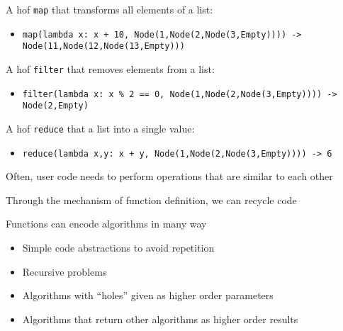 \documentclass{beamer}
\begin{document}
\begin{slide}{
\item A hof \texttt{map} that transforms all elements of a list:
\begin{itemize}
\item \texttt{map(lambda x: x + 10, Node(1,Node(2,Node(3,Empty)))) -> Node(11,Node(12,Node(13,Empty)))}
\end{itemize}
\item A hof \texttt{filter} that removes elements from a list:
\begin{itemize}
\item \texttt{filter(lambda x: x \% 2 == 0, Node(1,Node(2,Node(3,Empty)))) -> Node(2,Empty)}
\end{itemize}
\item A hof \texttt{reduce} that a list into a single value:
\begin{itemize}
\item \texttt{reduce(lambda x,y: x + y, Node(1,Node(2,Node(3,Empty)))) -> 6}
\end{itemize}
}\end{slide}

\begin{slide}{
\item Often, user code needs to perform operations that are similar to each other
\item Through the mechanism of function definition, we can recycle code
\item Functions can encode algorithms in many way
\begin{itemize}
\item Simple code abstractions to avoid repetition
\item Recursive problems
\item Algorithms with ``holes'' given as higher order parameters
\item Algorithms that return other algorithms as higher order results
\end{itemize}
}\end{slide}

\begin{thankyou}
\end{thankyou}
\end{document}
